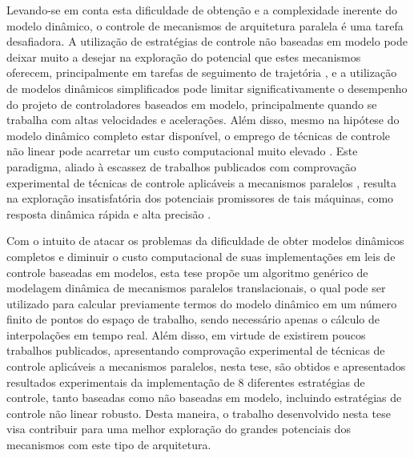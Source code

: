 \documentclass[]{politex}
\begin{document}
Levando-se em conta esta dificuldade de obtenção e a complexidade inerente do modelo dinâmico, o controle de mecanismos de arquitetura paralela é uma tarefa desafiadora. A utilização de estratégias de controle não baseadas em modelo pode deixar muito a desejar na exploração do potencial que estes mecanismos oferecem, principalmente em tarefas de seguimento de trajetória \cite{Chung}, e a utilização de modelos dinâmicos simplificados pode limitar significativamente o desempenho do projeto de controladores baseados em modelo, principalmente quando se trabalha com altas velocidades e acelerações. Além disso, mesmo na hipótese do modelo dinâmico completo estar disponível, o emprego de técnicas de controle não linear pode acarretar um custo  computacional muito elevado \cite{Craig, Slotini, Zubizarreta, Zubizarreta3}. Este paradigma, aliado à escassez de trabalhos publicados com comprovação experimental de técnicas de controle aplicáveis a mecanismos paralelos \cite{Rynaldo}, resulta na exploração insatisfatória dos potenciais promissores de tais máquinas, como resposta dinâmica rápida e alta precisão \cite{Abdellatif}.
	
Com o intuito de atacar os problemas da dificuldade de obter modelos dinâmicos completos e diminuir o custo computacional de suas implementações em leis de controle baseadas em modelos, esta tese propõe um algoritmo genérico de modelagem dinâmica de mecanismos paralelos translacionais, o qual pode ser utilizado para calcular previamente termos do modelo dinâmico em um número finito de pontos do espaço de trabalho, sendo necessário apenas o cálculo de interpolações em tempo real.  Além disso, em virtude de existirem poucos  trabalhos publicados, apresentando comprovação experimental de técnicas de controle aplicáveis a mecanismos paralelos, nesta tese, são obtidos e apresentados resultados experimentais da implementação de 8 diferentes estratégias de controle, tanto baseadas como não baseadas em modelo, incluindo estratégias de controle não linear robusto. Desta maneira, o trabalho desenvolvido nesta tese visa contribuir para uma melhor exploração do grandes potenciais dos mecanismos com este tipo de arquitetura.


    
\end{document}
